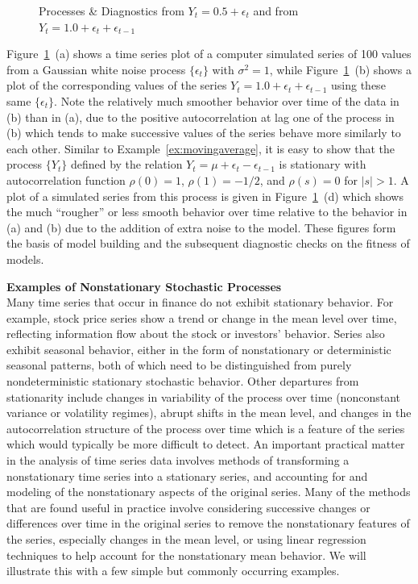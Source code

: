 \begin{ex}
\begin{figure}
{                        }
               \caption{Processes \& Diagnostics from $Y_t = 0.5 + \epsilon_t$ and from $Y_t =1.0 + \epsilon_t + \epsilon_{t-1}$\label{fig:sideways}}
            \end{figure}


Figure~\ref{fig:sideways}~(a) shows a time series plot of a computer simulated series of 100 values from a Gaussian white noise process $\{\epsilon_t\}$ with $\sigma^2=1$, while Figure~\ref{fig:sideways}~(b) shows a plot of the corresponding values of the series $Y_t = 1.0 + \epsilon_{t} + \epsilon_{t-1}$ using these same $\{\epsilon_t\}$.  Note the relatively much smoother behavior over time of the data in (b) than in (a), due to the positive autocorrelation at lag one of the process in (b) which tends to make successive values of the series behave more similarly to each other.  Similar to Example~\ref{ex:movingaverage}, it is easy to show that the process $\{Y_t\}$ defined by the relation $Y_t = \mu + \epsilon_{t} - \epsilon_{t-1}$ is stationary with autocorrelation function $\rho(0)=1$, $\rho(1)=-1/2$, and $\rho(s)=0$ for $|s|>1$. A plot of a simulated series from this process is given in Figure~\ref{fig:sideways}~(d) which shows the much ``rougher'' or less smooth behavior over time relative to the behavior  in (a) and (b) due to the addition of extra noise to the model. These figures form the basis of model building and the subsequent diagnostic checks on the fitness of models. 
\end{ex} 


\noindent \textbf{Examples of Nonstationary Stochastic Processes} \\


Many time series that occur in finance do not exhibit stationary behavior.  For example, stock price series show a trend or change in the mean level over time, reflecting information flow about the stock or investors' behavior. Series also exhibit seasonal behavior, either in the form of nonstationary or deterministic seasonal patterns, both of which need to be distinguished from purely nondeterministic stationary stochastic behavior. Other departures from stationarity include changes in variability of the process over time (nonconstant variance or volatility regimes), abrupt shifts in the mean level, and changes in the autocorrelation structure of the process over time which is a feature of the series which would typically be more difficult to detect.  An important practical matter in the analysis of time series data involves methods of transforming a nonstationary time series into a stationary series, and accounting for and modeling of the nonstationary aspects of the original series. Many of the methods that are found useful in practice involve considering successive changes or differences over time in the original series to remove the nonstationary features of the series, especially changes in the mean level, or using linear regression techniques to help account for the nonstationary mean behavior.  We will illustrate this with a few simple but commonly occurring examples. 


